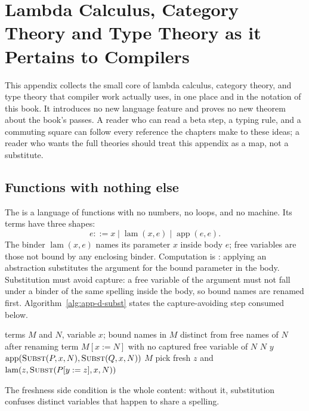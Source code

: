 \chapter{Lambda Calculus, Category Theory and Type Theory as it Pertains to Compilers}
\label{ch:app-d-foundations}

This appendix collects the small core of lambda calculus, category theory, and type theory that compiler work actually uses, in one place and in the notation of this book.
It introduces no new language feature and proves no new theorem about the book's passes.
A reader who can read a beta step, a typing rule, and a commuting square can follow every reference the chapters make to these ideas; a reader who wants the full theories should treat this appendix as a map, not a substitute.

\section{Functions with nothing else}
\label{sec:app-d-lambda}

The  is a language of functions with no numbers, no loops, and no machine.
Its terms have three shapes:
\begin{equation}
  e ::= x \mid \operatorname{lam}(x, e) \mid \operatorname{app}(e, e).
  \label{eq:app-d-syntax}
\end{equation}
The binder $\operatorname{lam}(x, e)$ names its parameter $x$ inside body $e$; free variables are those not bound by any enclosing binder.
Computation is : applying an abstraction substitutes the argument for the bound parameter in the body.
Substitution must avoid capture: a free variable of the argument must not fall under a binder of the same spelling inside the body, so bound names are renamed first.
Algorithm~\ref{alg:app-d-subst} states the capture-avoiding step consumed below.
\begin{algorithm}
\caption{Capture-avoiding substitution of $N$ for $x$ in $M$.}
\label{alg:app-d-subst}
\begin{pseudocode}
\Require terms $M$ and $N$, variable $x$; bound names in $M$ distinct from free names of $N$ after renaming
\Ensure term $M[x := N]$ with no captured free variable of $N$
 \Return $N$ \Else \Return $y$ \EndIf
{}
\State \Return $\operatorname{app}(\Call{Subst}{P, x, N}, \Call{Subst}{Q, x, N})$
 \Return $M$
\Else {}
\State pick fresh $z$ and \Return $\operatorname{lam}(z, \Call{Subst}{P[y := z], x, N})$
\EndIf
\EndFunction
\end{pseudocode}
\end{algorithm}
The freshness side condition is the whole content: without it, substitution confuses distinct variables that happen to share a spelling.


